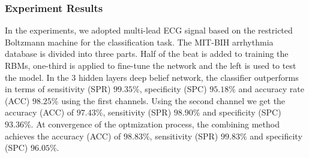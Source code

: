 \documentclass{bmcart}
\begin{document}
\subsubsection*{Experiment Results}

In the experiments, we adopted multi-lead ECG signal based on the restricted Boltzmann machine for the classification task. The MIT-BIH arrhythmia database is divided into three parts. Half of the beat is added to training the RBMs, one-third is applied to fine-tune the network and the left is used to test the model. In the 3 hidden layers deep belief network, the classifier outperforms in terms of sensitivity (SPR) $99.35\%$, specificity (SPC) $95.18\%$ and accuracy rate (ACC) $98.25\%$ using the first channels. Using the second channel we get the accuracy (ACC) of $97.43\%$, sensitivity (SPR) $98.90\%$ and specificity (SPC) $93.36\%$. At convergence of the optmization process, the combining method achieves the accuracy (ACC) of $98.83\%$, sensitivity (SPR) $99.83\%$ and specificity (SPC) $96.05\%$.
\end{document}
